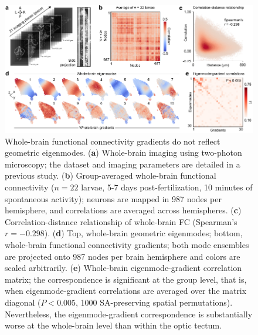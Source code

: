 \documentclass{article}
\begin{document}
\begin{figure}[t]
    \centering
    \includegraphics[width=1.0\linewidth]{figures/supp_wholebrain.pdf}
    \caption{Whole-brain functional connectivity gradients do not reflect geometric eigenmodes. (\textbf{a}) Whole-brain imaging using two-photon microscopy; the dataset and imaging parameters are detailed in a previous study\cite{legare2025structural}. (\textbf{b}) Group-averaged whole-brain functional connectivity ($n=22$ larvae, 5-7 days post-fertilization, 10 minutes of spontaneous activity); neurons are mapped in 987 nodes per hemisphere, and correlations are averaged across hemispheres. (\textbf{c}) Correlation-distance relationship of whole-brain FC (Spearman's $r=-0.298$). (\textbf{d}) Top, whole-brain geometric eigenmodes; bottom, whole-brain functional connectivity gradients; both mode ensembles are projected onto 987 nodes per brain hemisphere and colors are scaled arbitrarily. (\textbf{e}) Whole-brain eigenmode-gradient correlation matrix; the correspondence is significant at the group level, that is, when eigenmode-gradient correlations are averaged over the matrix diagonal ($P<0.005$, 1000 SA-preserving spatial permutations). Nevertheless, the eigenmode-gradient correspondence is substantially worse at the whole-brain level than within the optic tectum.}
    \label{supp_wholebrain}
\end{figure}

\newpage
\end{document}
